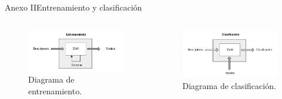 \documentclass{beamer}
\begin{document}
			\begin{frame}{Anexo II}{Entrenamiento y clasificación}
			  \begin{columns}[onlytextwidth]
   	 			\begin{column}{0.5\textwidth}
		            \begin{figure}[bt]
    			    			\centering
            		    		\includegraphics[width=6cm]{imagenes/Entrenamiento.png}
          				\caption{Diagrama de entrenamiento.}
            			\end{figure}
 				\end{column}
    				\begin{column}{0.5\textwidth}
		            \begin{figure}[bt]
        					\centering
        		        		\includegraphics[width=6cm]{imagenes/Clasificacion.png}
        	  				\caption{Diagrama de clasificación.}
		            \end{figure}
        			\end{column}
 			  \end{columns}
        \end{frame}
\end{document}
